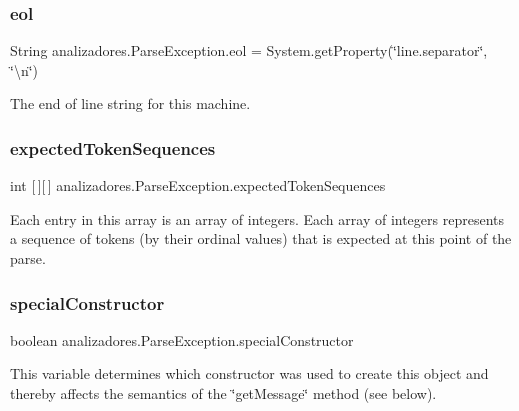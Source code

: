 \subsubsection{\texorpdfstring{eol}{eol}}
{\footnotesize\ttfamily String analizadores.\+Parse\+Exception.\+eol = System.\+get\+Property(\char`\"{}line.\+separator\char`\"{}, \char`\"{}\textbackslash{}n\char`\"{})\hspace{0.3cm}{\ttfamily [protected]}}

The end of line string for this machine. \mbox{\label{classanalizadores_1_1_parse_exception_aef57ab03c5f063e50c0eaa6b0e525946}} 
\subsubsection{\texorpdfstring{expected\+Token\+Sequences}{expectedTokenSequences}}
{\footnotesize\ttfamily int \mbox{[}$\,$\mbox{]}\mbox{[}$\,$\mbox{]} analizadores.\+Parse\+Exception.\+expected\+Token\+Sequences}

Each entry in this array is an array of integers. Each array of integers represents a sequence of tokens (by their ordinal values) that is expected at this point of the parse. \mbox{\label{classanalizadores_1_1_parse_exception_a24ccd87a4ef257c9e62418a4009bc5cd}} 
\subsubsection{\texorpdfstring{special\+Constructor}{specialConstructor}}
{\footnotesize\ttfamily boolean analizadores.\+Parse\+Exception.\+special\+Constructor\hspace{0.3cm}{\ttfamily [protected]}}

This variable determines which constructor was used to create this object and thereby affects the semantics of the \char`\"{}get\+Message\char`\"{} method (see below). \mbox{\label{classanalizadores_1_1_parse_exception_a8d39ada57041e6c5b993d2b6fd66d6cc}} 

